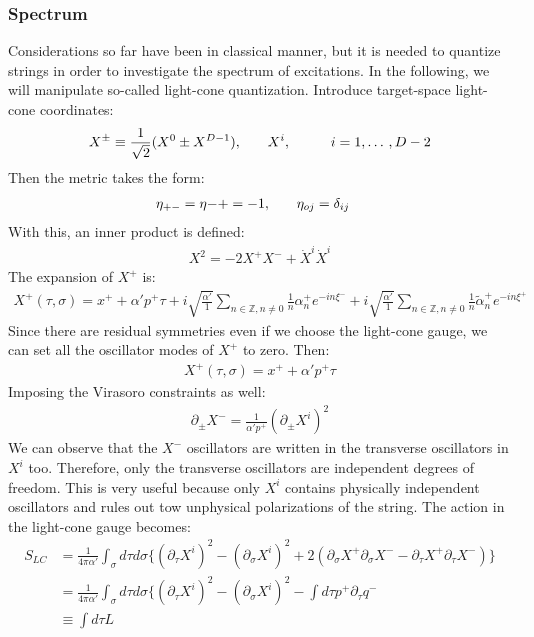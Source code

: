 \subsubsection{Spectrum}
Considerations so far have been in classical manner, but it is needed to quantize strings in order to investigate the spectrum of excitations. In the following, we will manipulate so-called light-cone quantization. Introduce target-space light-cone coordinates:
\begin{align}
    X^{\pm} \equiv \frac{1}{\sqrt{2}} (X^{0} \pm X^{D-1}), & \qq{} X^{i}, & \qq{} i = 1,\dotso ,D-2
\end{align} 
Then the metric takes the form:
\begin{align}
     \eta _{+-} = \eta {-+} = -1, & \qq{} \eta _{oj} = \delta _{ij}
\end{align}
With this, an inner product is defined:
\begin{align}
    X^{2} = -2X^{+}X^{-} + \dot {X}^{i} \dot {X}^{i}
\end{align}
The expansion of $X^{+}$ is:
\begin{align}
    X^{+} (\tau,\sigma) = x^{+} + \alpha' p^{+} \tau + i\sqrt{\frac{\alpha'}{1}} \sum _{n\in \mathbb{Z},n\neq 0} \frac{1}{n} \alpha _{n} ^{+} e^{-in\xi ^{-}} +i\sqrt{\frac{\alpha'}{1}} \sum _{n\in \mathbb{Z},n\neq 0} \frac{1}{n} \tilde{\alpha} _{n} ^{+} e^{-in\xi ^{+}}
\end{align}
Since there are residual symmetries even if we choose the light-cone gauge, we can set all the oscillator modes of $X^{+}$ to zero. Then:
\begin{align}
    X^{+} (\tau,\sigma) = x^{+} + \alpha'p^{+}\tau
\end{align}
Imposing the Virasoro constraints as well:
\begin{align}
    \partial _{\pm} X^{-} = \frac{1}{\alpha' p^{+}} (\partial _{\pm} X^{i})^{2}
\end{align}
We can observe that the $X^{-}$ oscillators are written in the transverse oscillators in $X^{i}$ too. Therefore, only the transverse oscillators are independent degrees of freedom. This is very useful because only $X^{i}$ contains physically independent oscillators and rules out tow unphysical polarizations of the string. The action in the light-cone gauge becomes:
\begin{align}
    S_{LC} &= \frac{1}{4\pi \alpha'} \int _{\sigma} d\tau d\sigma \lbrace (\partial _{\tau} X^{i})^{2} - (\partial _{\sigma} X^{i})^{2} + 2(\partial _{\sigma} X^{+} \partial _{\sigma} X^{-} - \partial _{\tau} X^{+} \partial _{\tau} X^{-}) \rbrace \nonumber \\
    &= \frac{1}{4\pi\alpha'} \int _{\sigma} d\tau d\sigma \lbrace (\partial _{\tau} X^{i})^{2} - (\partial _{\sigma} X^{i})^{2} - \int d\tau p^{+} \partial _{\tau} q^{-} \nonumber \\
    & \equiv \int d\tau L 
\end{align}
